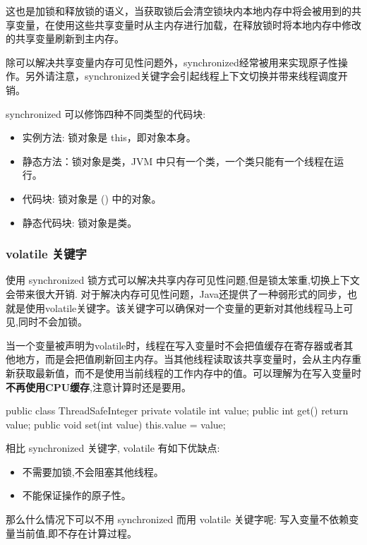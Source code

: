 这也是加锁和释放锁的语义，当获取锁后会清空锁块内本地内存中将会被用到的共享变量，在使用这些共享变量时从主内存进行加载，在释放锁时将本地内存中修改的共享变量刷新到主内存。

除可以解决共享变量内存可见性问题外，synchronized经常被用来实现原子性操作。另外请注意，synchronized关键字会引起线程上下文切换并带来线程调度开销。

synchronized 可以修饰四种不同类型的代码块:
\begin{itemize}
    \item 实例方法: 锁对象是 this，即对象本身。
    \item 静态方法：锁对象是类，JVM 中只有一个类，一个类只能有一个线程在运行。
    \item 代码块: 锁对象是 () 中的对象。
    \item 静态代码块: 锁对象是类。
\end{itemize}

\subsubsection*{volatile 关键字}

使用 synchronized 锁方式可以解决共享内存可见性问题,但是锁太笨重,切换上下文会带来很大开销. 对于解决内存可见性问题，Java还提供了一种弱形式的同步，也就是使用volatile关键字。该关键字可以确保对一个变量的更新对其他线程马上可见,同时不会加锁。

当一个变量被声明为volatile时，线程在写入变量时不会把值缓存在寄存器或者其他地方，而是会把值刷新回主内存。当其他线程读取该共享变量时，会从主内存重新获取最新值，而不是使用当前线程的工作内存中的值。可以理解为在写入变量时\textbf{不再使用CPU缓存},注意计算时还是要用。

\begin{Java}
public class ThreadSafeInteger {
    private volatile int value;
    public int get() {
        return value;
    }        
    public void set(int value) {
        this.value = value;
    }
}
\end{Java}

相比 synchronized 关键字, volatile 有如下优缺点:
\begin{itemize}
    \item 不需要加锁,不会阻塞其他线程。
    \item 不能保证操作的原子性。
\end{itemize}

那么什么情况下可以不用 synchronized 而用 volatile 关键字呢: 写入变量不依赖变量当前值,即不存在计算过程。

